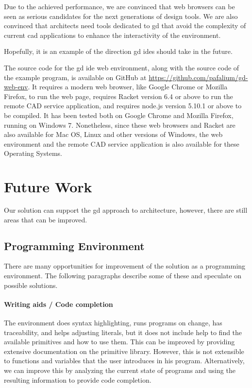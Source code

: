 Due to the achieved performance, we are convinced that web browsers can be seen as serious candidates for the next generations of design tools.
We are also convinced that architects need tools dedicated to \gls{gd} that avoid the complexity of current \gls{cad} applications to enhance the interactivity of the environment.

Hopefully, it is an example of the direction \gls{gd} \glspl{ide} should take in the future.

The source code for the \gls{gd} \gls{ide} web environment, along with the source code of the example program, is available on GitHub at \url{https://github.com/pafalium/gd-web-env}.
It requires a modern web browser, like Google Chrome or Mozilla Firefox, to run the web page, requires Racket version 6.4 or above to run the remote CAD service application, and requires node.js version 5.10.1 or above to be compiled.
It has been tested both on Google Chrome and Mozilla Firefox, running on Windows 7.
Nonetheless, since these web browsers and Racket are also available for Mac OS, Linux and other versions of Windows, the web environment and the remote CAD service application is also available for these Operating Systems.


\section{Future Work}
Our solution can support the \gls{gd} approach to architecture, however, there are still areas that can be improved.


\subsection{Programming Environment}
There are many opportunities for improvement of the solution as a programming environment.
The following paragraphs describe some of these and speculate on possible solutions.

\paragraph{Writing aids / Code completion}
The environment does syntax highlighting, runs programs on change, has traceability, and helps adjusting literals, but it does not include help to find the available primitives and how to use them.
This can be improved by providing extensive documentation on the primitive library.
However, this is not extensible to functions and variables that the user introduces in his program.
Alternatively, we can improve this by analyzing the current state of programs and using the resulting information to provide code completion.

